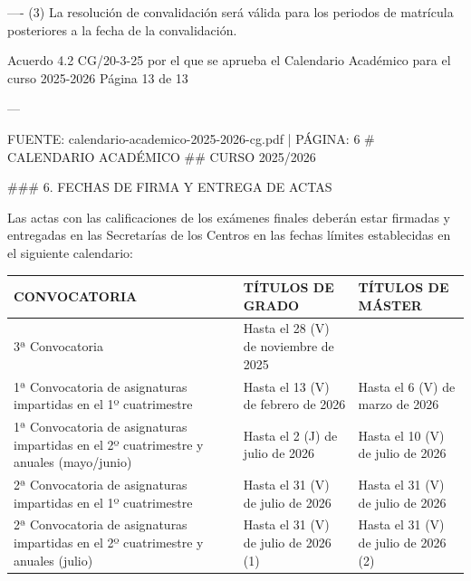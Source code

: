 \documentclass{article}
\begin{document}
\begin{itemize}
\begin{itemize}
\begin{scriptsize}
                  ----
                  (3) La resolución de convalidación será válida para los periodos de matrícula posteriores a la fecha de la convalidación.

                  Acuerdo 4.2 CG/20-3-25 por el que se aprueba el Calendario Académico para el curso 2025-2026      Página 13 de 13

                  ---

                  FUENTE: calendario-academico-2025-2026-cg.pdf | PÁGINA: 6
                  \# CALENDARIO ACADÉMICO
                  \#\# CURSO 2025/2026

                  \#\#\# 6. FECHAS DE FIRMA Y ENTREGA DE ACTAS

                  Las actas con las calificaciones de los exámenes finales deberán estar firmadas y entregadas en las Secretarías de los Centros en las fechas límites establecidas en el siguiente calendario:

                  \vspace{0.4cm}
                  \begin{table}[h!]\centering\renewcommand{\arraystretch}{1.3}
                    \begin{tabular}{|p{}|p{}|p{}|}\hline
                      CONVOCATORIA                                                                           & TÍTULOS DE GRADO                     & TÍTULOS DE MÁSTER                    \\\hline
                      3ª Convocatoria                                                                        & Hasta el 28 (V) de noviembre de 2025 &                                      \\\hline
                      1ª Convocatoria de asignaturas impartidas en el 1º cuatrimestre                        & Hasta el 13 (V) de febrero de 2026   & Hasta el 6 (V) de marzo de 2026      \\\hline
                      1ª Convocatoria de asignaturas impartidas en el 2º cuatrimestre y anuales (mayo/junio) & Hasta el 2 (J) de julio de 2026      & Hasta el 10 (V) de julio de 2026     \\\hline
                      2ª Convocatoria de asignaturas impartidas en el 1º cuatrimestre                        & Hasta el 31 (V) de julio de 2026     & Hasta el 31 (V) de julio de 2026     \\\hline
                      2ª Convocatoria de asignaturas impartidas en el 2º cuatrimestre y anuales (julio)      & Hasta el 31 (V) de julio de 2026 (1) & Hasta el 31 (V) de julio de 2026 (2) \\\hline
                    \end{tabular}\end{table}
                  \vspace{0.4cm}


\end{scriptsize}
\end{itemize}
\end{itemize}
\end{document}
